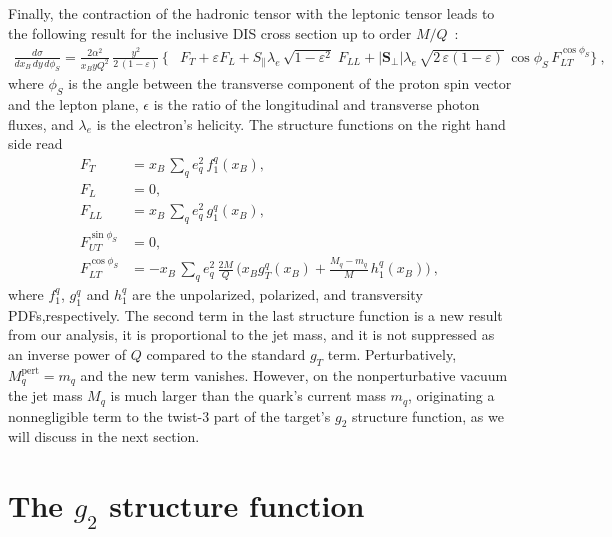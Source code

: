 \documentclass[preprintnumbers,floatfix,nofootinbib]{revtex4}
\newcommand{\xbj}{{x_B}}                   %
\newcommand{\mj}{M_q}
\newcommand{\mq}{m_q}
\begin{document}
Finally, the contraction of the hadronic tensor with the leptonic tensor leads
to the following result for the inclusive DIS cross section up to order $M/Q$~\cite{Bacchetta:2006tn}:
\begin{align}
\frac{d\sigma}{d\xbj \, dy\, d\phi_S}
=
\frac{2 \alpha^2}{\xbj y Q^2}\,
\frac{y^2}{2\,(1-\varepsilon)}\, 
\biggl\{
&F_{T} + \varepsilon F_{L}
+ S_\parallel \lambda_e\,
  \sqrt{1-\varepsilon^2}\; 
F_{LL}
+ |\bm{S}_\perp| \lambda_e\, \sqrt{2\,\varepsilon (1-\varepsilon)}\, 
  \cos\phi_S\, 
F_{LT}^{\cos \phi_S}
 \biggr\} \ ,
\label{e:crossdis}
\end{align}
where $\phi_S$ is the angle between the transverse component of the proton spin vector and the lepton plane, $\epsilon$ is the ratio of the longitudinal and transverse photon fluxes, and $\lambda_e$ is the electron's helicity. 
The structure functions on the right hand side read
\begin{align}
F_{T} &= \xbj\,\sum_q e_q^2\,f_1^q(\xbj),
\\
F_{L} &= 0,
\\
F_{LL} &=\xbj\,\sum_q e_q^2\,g_1^q(\xbj),
\label{e:FLLint}
\\
F_{UT}^{\sin \phi_S}&=0,
\label{e:FUTint}
\\
F_{LT}^{\cos \phi_S}&=-\xbj\,\sum_q e_q^2\, \frac{2M}{Q}\,
\biggl(\xbj  g_T^q(\xbj)
   + \frac{\mj -\mq}{M} \, h_{1}^q(\xbj) \biggr) \ ,
\label{e:FLTint}
\end{align}
where $f_1^q$, $g_1^q$ and $h_1^q$ are the unpolarized, polarized, and transversity PDFs,respectively.
The second term in the last structure function is a new result from our
analysis, it is proportional to the jet mass, and it is not suppressed as an
inverse power of $Q$ compared to the 
standard $g_T$ term. Perturbatively, $M_q^\text{pert}=m_q$ and the new term vanishes. However, on the nonperturbative vacuum the jet mass $M_q$ is much larger than the quark's current mass $m_q$, originating a nonnegligible term to the twist-3 part of the target's $g_2$ structure function, as we will discuss in the next section.  

 

\section{The $g_2$ structure function}
\end{document}
